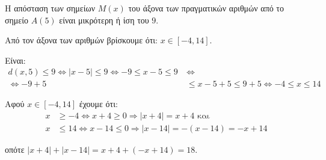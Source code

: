 
\begin{alist}
\item Η απόσταση των σημείων $M(x)$ του άξονα των πραγματικών αριθμών από το σημείο $A(5)$ είναι μικρότερη ή ίση του $9$.

\item Από τον άξονα των αριθμών βρίσκουμε ότι: $x \in [-4, 14]$.

\item Είναι:
\begin{align*}
d(x, 5) \le 9 \Leftrightarrow |x - 5| \le 9 \Leftrightarrow -9 \le x - 5 \le 9 \ &\Leftrightarrow \\
\Leftrightarrow -9 + 5 &\le x - 5 + 5 \le 9 + 5 \Leftrightarrow -4 \le x \le 14
\end{align*}

\item Αφού $x \in [-4, 14]$ έχουμε ότι:
\begin{align*}
x &\ge -4 \Leftrightarrow x + 4 \ge 0 \Rightarrow |x + 4| = x + 4\text{ και} \\
x &\le 14 \Leftrightarrow x - 14 \le 0 \Rightarrow |x - 14| = -(x - 14) = -x + 14
\end{align*}

οπότε $|x + 4| + |x - 14| = x + 4 + (-x + 14) = 18$.
\end{alist}

